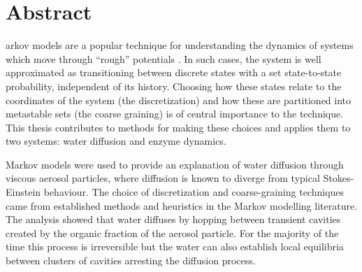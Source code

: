 %
%
%

\chapter*{Abstract}
\begin{SingleSpace}
arkov models  are a popular technique for understanding the dynamics of systems which move through ``rough'' potentials \cite{zwanzigDiffusionRoughPotential1988}. In such cases, the system is well approximated as transitioning between discrete states with a set state-to-state probability, independent of its history. Choosing how these states relate to the coordinates of the system (the discretization) and how these are partitioned into metastable sets (the coarse graining) is of central importance to the technique.  This thesis contributes to methods for making these choices and applies them to two systems: water diffusion and enzyme dynamics.
 
Markov models were used to provide an explanation of water diffusion through viscous aerosol particles, where diffusion is known to diverge from typical Stokes-Einstein behaviour. The choice of discretization and coarse-graining techniques came from established methods and heuristics in the Markov modelling literature. The analysis showed that water diffuses by hopping between transient cavities created by the organic fraction of the aerosol particle. For the majority of the time this process is irreversible but the water can also establish local equilibria between clusters of cavities arresting the diffusion process. 


\end{SingleSpace}
